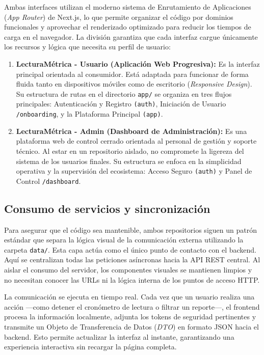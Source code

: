 \documentclass[12pt, atypical, journal]{article}
\begin{document}
Ambas interfaces utilizan el moderno sistema de Enrutamiento de Aplicaciones (\textit{App Router}) de Next.js, lo que permite organizar el código por dominios funcionales y aprovechar el renderizado optimizado para reducir los tiempos de carga en el navegador. La división garantiza que cada interfaz cargue únicamente los recursos y lógica que necesita su perfil de usuario:

\begin{enumerate}
    \item \textbf{LecturaMétrica - Usuario (Aplicación Web Progresiva):}
    Es la interfaz principal orientada al consumidor. Está adaptada para funcionar de forma fluida tanto en dispositivos móviles como de escritorio (\textit{Responsive Design}). Su estructura de rutas en el directorio \texttt{app/} se organiza en tres flujos principales: Autenticación y Registro \texttt{(auth)}, Iniciación de Usuario \texttt{/onboarding}, y la Plataforma Principal \texttt{(app)}.
   
    \item \textbf{LecturaMétrica - Admin (Dashboard de Administración):}
    Es una plataforma web de control cerrado orientada al personal de gestión y soporte técnico. Al estar en un repositorio aislado, no compromete la ligereza del sistema de los usuarios finales. Su estructura se enfoca en la simplicidad operativa y la supervisión del ecosistema: Acceso Seguro \texttt{(auth)} y Panel de Control \texttt{/dashboard}.
\end{enumerate}

\subsection{Consumo de servicios y sincronización}
Para asegurar que el código sea mantenible, ambos repositorios siguen un patrón estándar que separa la lógica visual de la comunicación externa utilizando la carpeta \texttt{data/}.
Esta capa actúa como el único punto de contacto con el backend. Aquí se centralizan todas las peticiones asíncronas hacia la API REST central. Al aislar el consumo del servidor, los componentes visuales se mantienen limpios y no necesitan conocer las URLs ni la lógica interna de los puntos de acceso HTTP.

La comunicación se ejecuta en tiempo real. Cada vez que un usuario realiza una acción —como detener el cronómetro de lectura o filtrar un reporte—, el frontend procesa la información localmente, adjunta los tokens de seguridad pertinentes y transmite un Objeto de Transferencia de Datos (\textit{DTO}) en formato JSON hacia el backend. Esto permite actualizar la interfaz al instante, garantizando una experiencia interactiva sin recargar la página completa.
\end{document}
